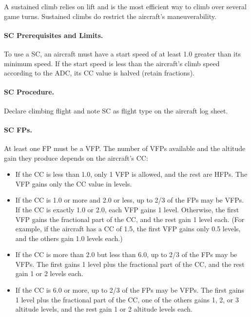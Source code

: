 {}{

A sustained climb relies on lift and is the most efficient way to climb over several game turns. Sustained climbs do restrict the aircraft’s maneuverability.

\paragraph{SC Prerequisites and Limits.} To use a SC, an aircraft must have a start speed of at least 1.0 greater than its minimum speed. If the start speed is less than the aircraft’s climb speed according to the ADC, its CC value is halved (retain fractions).

\paragraph{SC Procedure.} Declare climbing flight and note SC as flight type on the aircraft log sheet.

\paragraph{SC FPs.} At least one FP must be a VFP. The number of VFPs available and the altitude gain they produce depends on the aircraft’s CC:

\begin{itemize}
    \item If the CC is less than 1.0, only 1 VFP is allowed, and the rest are HFPs. The VFP gains only the CC value in levels.

    \item If the CC is 1.0 or more and 2.0 or less, up to 2/3 of the FPs may be VFPs.
If the CC is exactly 1.0 or 2.0, each VFP gains 1 level. Otherwise, the first VFP gains the fractional part of the CC, and the rest gain 1 level each. (For example, if the aircraft has a CC of 1.5, the first VFP gains only 0.5 levels, and the others gain 1.0 levels each.) 

    \item If the CC is more than 2.0 but less than 6.0, up to 2/3 of the FPs may be VFPs. The first gains 1 level plus the fractional part of the CC, and the rest gain 1 or 2 levels each. 

    \item If the CC is 6.0 or more,  up to 2/3 of the FPs may be VFPs. The first gains 1 level plus the fractional part of the CC, one of the others gains 1, 2, or 3 altitude levels, and the rest gain 1 or 2 altitude levels each. 


\end{itemize}}

